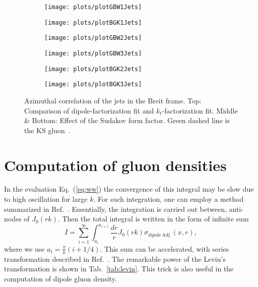 \documentclass[a4,12pt]{article}
\newcommand{\sdpa}[0]{\sigma_{\mathrm{dipole\,Adj.}}}
\begin{document}
\begin{figure}[p]
	\begin{subfigure}{0.48\textwidth}
		\texttt{[image: plots/plotGBW1Jets]} 
	\end{subfigure}
	\begin{subfigure}{0.48\textwidth}
		\texttt{[image: plots/plotBGK1Jets]} 
	\end{subfigure}
	\begin{subfigure}{0.48\textwidth}
		\texttt{[image: plots/plotGBW2Jets]}
	\end{subfigure}
	\begin{subfigure}{0.48\textwidth}
		\texttt{[image: plots/plotGBW3Jets]}
	\end{subfigure}
	\begin{subfigure}{0.48\textwidth}
		\texttt{[image: plots/plotBGK2Jets]}
	\end{subfigure}
	\begin{subfigure}{0.48\textwidth}
		\texttt{[image: plots/plotBGK3Jets]}
	\end{subfigure}
\caption{\footnotesize Azimuthal correlation of the jets in the Breit frame. Top: Comparison of dipole-factorization fit and $k_t$-factorization fit. Middle \& Bottom: Effect of the Sudakov form factor. Green dashed line is the KS gluon~\cite{vanHameren:2021sqc}. }
\label{fig:jj-breit}
\end{figure}



\appendix	
\section{Computation of gluon densities}
In the evaluation Eq.~(\ref{eq:ww}) the convergence of this integral may be slow due to high oscillation for large $k$.
For such integration, one can employ a method summarized in Ref.~\cite{LYNESS1985109}. 
Essentially, the integration is carried out between, anti-nodes of $J_0(rk)$. Then the total integral is written in the form of infinite sum
\begin{equation}
	I=\sum^\infty_{i=1} \int^{a_{i+1}}_{a_i} \frac{dr}{r}J_0(r k) \sdpa(x,r),
\end{equation}
where we use $a_{i}=\frac{\pi}{k}(i+1/4)$.
This sum can be accelerated, with series transformation described in Ref.~\cite{doi:10.1080/00207167308803075,Weniger:1989rea,HOMEIER19951}.
The remarkable power of the Levin's transformation is shown in Tab.~\ref{tab:levin}.
This trick is also useful in the computation of dipole gluon density. 
\end{document}
